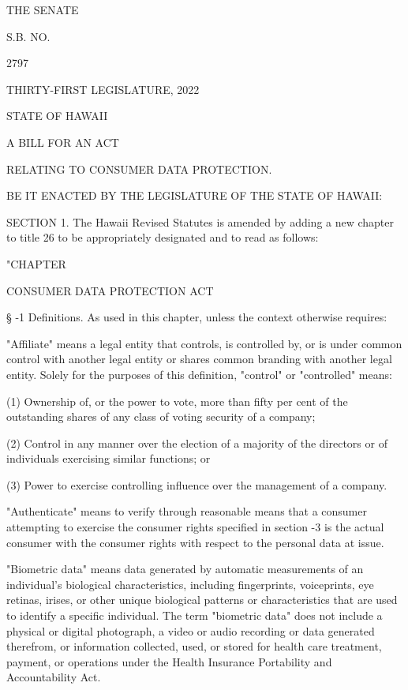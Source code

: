 THE SENATE

S.B. NO.

2797

THIRTY-FIRST LEGISLATURE, 2022

 

STATE OF HAWAII

 

 

 

 

 

 

A BILL FOR AN ACT

 

 

RELATING TO CONSUMER DATA PROTECTION.

 

 

BE IT ENACTED BY THE LEGISLATURE OF THE STATE OF HAWAII:

 


     SECTION 1.  The Hawaii Revised Statutes is amended by adding a new chapter to title 26 to be appropriately designated and to read as follows:

"CHAPTER

CONSUMER DATA PROTECTION ACT

     §   -1  Definitions.  As used in this chapter, unless the context otherwise requires:

     "Affiliate" means a legal entity that controls, is controlled by, or is under common control with another legal entity or shares common branding with another legal entity.  Solely for the purposes of this definition, "control" or "controlled" means:

     (1)  Ownership of, or the power to vote, more than fifty per cent of the outstanding shares of any class of voting security of a company;

     (2)  Control in any manner over the election of a majority of the directors or of individuals exercising similar functions; or

     (3)  Power to exercise controlling influence over the management of a company.

     "Authenticate" means to verify through reasonable means that a consumer attempting to exercise the consumer rights specified in section    -3 is the actual consumer with the consumer rights with respect to the personal data at issue.

     "Biometric data" means data generated by automatic measurements of an individual's biological characteristics, including fingerprints, voiceprints, eye retinas, irises, or other unique biological patterns or characteristics that are used to identify a specific individual.  The term "biometric data" does not include a physical or digital photograph, a video or audio recording or data generated therefrom, or information collected, used, or stored for health care treatment, payment, or operations under the Health Insurance Portability and Accountability Act.

